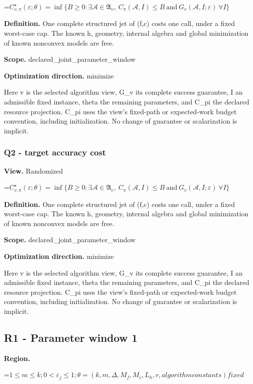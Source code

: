 \documentclass[10pt,a4paper]{article}
\newcommand{\AtlasMath}[1]{\par\begingroup\centering\setbox0=\hbox{$\displaystyle #1$}\ifdim\wd0>1.4\linewidth\typeout{ATLAS WIDE FORMULA: \the\wd0}\fi\ifdim\wd0>\linewidth\resizebox{\linewidth}{!}{\box0}\else\box0\fi\par\endgroup}
\begin{document}
\AtlasMath{C^\star_{v,\pi}(\varepsilon;\theta)=\inf\{B\ge0:\exists\mathcal A\in\mathfrak A_v,\ C_\pi(\mathcal A,I)\le B\ \text{and}\ G_v(\mathcal A,I;\varepsilon)\ \forall I\}}
\textbf{Definition.} One complete structured jet of (f,c) costs one call, under a fixed worst-case cap. The known h, geometry, internal algebra and global minimization of known nonconvex models are free.

\textbf{Scope.} declared\_joint\_parameter\_window

\textbf{Optimization direction.} minimize

Here v is the selected algorithm view, G\_v its complete success guarantee, I an admissible fixed instance, theta the remaining parameters, and C\_pi the declared resource projection. C\_pi uses the view's fixed-path or expected-work budget convention, including initialization. No change of guarantee or scalarization is implicit.

\subsubsection{Q2 - target accuracy cost}
\textbf{View.} Randomized

\AtlasMath{C^\star_{v,\pi}(\varepsilon;\theta)=\inf\{B\ge0:\exists\mathcal A\in\mathfrak A_v,\ C_\pi(\mathcal A,I)\le B\ \text{and}\ G_v(\mathcal A,I;\varepsilon)\ \forall I\}}
\textbf{Definition.} One complete structured jet of (f,c) costs one call, under a fixed worst-case cap. The known h, geometry, internal algebra and global minimization of known nonconvex models are free.

\textbf{Scope.} declared\_joint\_parameter\_window

\textbf{Optimization direction.} minimize

Here v is the selected algorithm view, G\_v its complete success guarantee, I an admissible fixed instance, theta the remaining parameters, and C\_pi the declared resource projection. C\_pi uses the view's fixed-path or expected-work budget convention, including initialization. No change of guarantee or scalarization is implicit.

\subsection{R1 - Parameter window 1}
\textbf{Region.} 
\AtlasMath{1\le m\le k;0<\varepsilon_j\le 1;\theta=(k,m,\Delta,M_f,M_c,L_h,r,algorithm constants) fixed}
\end{document}
